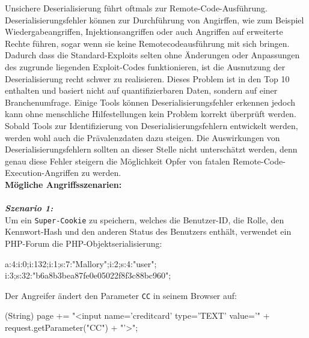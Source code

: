 Unsichere Deserialisierung führt oftmals zur Remote-Code-Ausführung. Deserialisierungsfehler können zur Durchführung von Angirffen, wie zum Beispiel Wiedergabeangriffen, Injektionsangriffen oder auch Angriffen auf erweiterte Rechte führen, sogar wenn sie keine Remotecodeausführung mit sich bringen\cite[6]{owasp17top10}. Dadurch dass die Standard-Exploits selten ohne Änderungen oder Anpassungen des zugrunde liegenden Exploit-Codes funktionieren, ist die Ausnutzung der Deserialisierung recht schwer zu realisieren. Dieses Problem ist in den Top 10 enthalten und basiert nicht auf quantifizierbaren Daten, sondern auf einer Branchenumfrage. Einige Tools können Deserialisierungsfehler erkennen jedoch kann ohne menschliche Hilfestellungen kein Problem korrekt überprüft werden. Sobald Tools zur Identifizierung von Deserialisierungsfehlern entwickelt werden, werden wohl auch die Prävalenzdaten dazu steigen. Die Auswirkungen von Deserialisierungsfehlern sollten an dieser Stelle nicht unterschätzt werden, denn genau diese Fehler steigern die Möglichkeit Opfer von fatalen Remote-Code-Execution-Angriffen zu werden\cite[13]{owasp17top10}.\\

\textbf{Mögliche Angriffsszenarien:}\\
\\
\textbf{\textit{Szenario 1:}}\\

Um ein \texttt{Super-Cookie} zu speichern, welches die Benutzer-ID, die Rolle, den Kennwort-Hash und den anderen Status des Benutzers enthält, verwendet ein PHP-Forum die PHP-Objektserialisierung\cite[13]{owasp17top10}:\\

\begin{LaTeXCode}[caption={Unsichere Deserialisierung - Beispiel 1},captionpos=b, label=LaTeXCode:ud1][numbers=none]
a:4:{i:0;i:132;i:1;s:7:"Mallory";i:2;s:4:"user";
i:3;s:32:"b6a8b3bea87fe0e05022f8f3c88bc960";}
\end{LaTeXCode}

Der Angreifer ändert den Parameter \texttt{CC} in seinem Browser auf:\\

\begin{LaTeXCode}[caption={Unsichere Deserialisierung - Beispiel 2},captionpos=b, label=LaTeXCode:ud2][numbers=none]
	(String) page += "<input name='creditcard' type='TEXT'
	value='" + request.getParameter("CC") + "'>";
\end{LaTeXCode}

